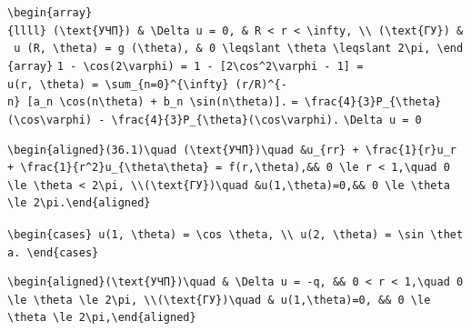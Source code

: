 \documentclass[
  ukrainian,
]{article}
\begin{document}
\texttt{\textbackslash{}begin\{array\}\{llll\}\ (\textbackslash{}text\{УЧП\})\ \&\ \textbackslash{}Delta\ u\ =\ 0,\ \&\ R\ \textless{}\ r\ \textless{}\ \textbackslash{}infty,\ \textbackslash{}\textbackslash{}\ (\textbackslash{}text\{ГУ\})\ \&\ u\ (R,\ \textbackslash{}theta)\ =\ g\ (\textbackslash{}theta),\ \&\ 0\ \textbackslash{}leqslant\ \textbackslash{}theta\ \textbackslash{}leqslant\ 2\textbackslash{}pi,\ \textbackslash{}end\{array\}}
\texttt{1\ -\ \textbackslash{}cos(2\textbackslash{}varphi)\ =\ 1\ -\ {[}2\textbackslash{}cos\^{}2\textbackslash{}varphi\ -\ 1{]}\ =}
\texttt{u(r,\ \textbackslash{}theta)\ =\ \textbackslash{}sum\_\{n=0\}\^{}\{\textbackslash{}infty\}\ (r/R)\^{}\{-n\}\ {[}a\_n\ \textbackslash{}cos(n\textbackslash{}theta)\ +\ b\_n\ \textbackslash{}sin(n\textbackslash{}theta){]}.}
\texttt{=\ \textbackslash{}frac\{4\}\{3\}P\_\{\textbackslash{}theta\}(\textbackslash{}cos\textbackslash{}varphi)\ -\ \textbackslash{}frac\{4\}\{3\}P\_\{\textbackslash{}theta\}(\textbackslash{}cos\textbackslash{}varphi).}
\texttt{\textbackslash{}Delta\ u\ =\ 0}

\begin{verbatim}
\begin{aligned}(36.1)\quad (\text{УЧП})\quad &u_{rr} + \frac{1}{r}u_r + \frac{1}{r^2}u_{\theta\theta} = f(r,\theta),&& 0 \le r < 1,\quad 0 \le \theta < 2\pi, \\(\text{ГУ})\quad &u(1,\theta)=0,&& 0 \le \theta \le 2\pi.\end{aligned}
\end{verbatim}

\texttt{\textbackslash{}begin\{cases\}\ u(1,\ \textbackslash{}theta)\ =\ \textbackslash{}cos\ \textbackslash{}theta,\ \textbackslash{}\textbackslash{}\ u(2,\ \textbackslash{}theta)\ =\ \textbackslash{}sin\ \textbackslash{}theta.\ \textbackslash{}end\{cases\}}

\begin{verbatim}
\begin{aligned}(\text{УЧП})\quad & \Delta u = -q, && 0 < r < 1,\quad 0 \le \theta \le 2\pi, \\(\text{ГУ})\quad & u(1,\theta)=0, && 0 \le \theta \le 2\pi,\end{aligned}
\end{verbatim}
\end{document}

